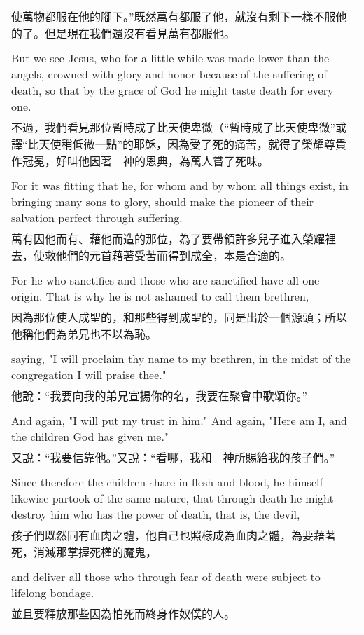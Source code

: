 \begin{tabularx}{\textwidth}{p{}}
使萬物都服在他的腳下。”既然萬有都服了他，就沒有剩下一樣不服他的了。但是現在我們還沒有看見萬有都服他。 \\ \\
But we see Jesus, who for a little while was made lower than the angels, crowned with glory and honor because of the suffering of death, so that by the grace of God he might taste death for every one. \\
不過，我們看見那位暫時成了比天使卑微（“暫時成了比天使卑微”或譯“比天使稍低微一點”的耶穌，因為受了死的痛苦，就得了榮耀尊貴作冠冕，好叫他因著　神的恩典，為萬人嘗了死味。 \\ \\
For it was fitting that he, for whom and by whom all things exist, in bringing many sons to glory, should make the pioneer of their salvation perfect through suffering. \\
萬有因他而有、藉他而造的那位，為了要帶領許多兒子進入榮耀裡去，使救他們的元首藉著受苦而得到成全，本是合適的。 \\ \\
For he who sanctifies and those who are sanctified have all one origin. That is why he is not ashamed to call them brethren, \\
因為那位使人成聖的，和那些得到成聖的，同是出於一個源頭；所以他稱他們為弟兄也不以為恥。 \\ \\
saying, "I will proclaim thy name to my brethren, in the midst of the congregation I will praise thee." \\
他說：“我要向我的弟兄宣揚你的名，我要在聚會中歌頌你。” \\ \\
And again, "I will put my trust in him." And again, "Here am I, and the children God has given me." \\
又說：“我要信靠他。”又說：“看哪，我和　神所賜給我的孩子們。” \\ \\
Since therefore the children share in flesh and blood, he himself likewise partook of the same nature, that through death he might destroy him who has the power of death, that is, the devil, \\
孩子們既然同有血肉之體，他自己也照樣成為血肉之體，為要藉著死，消滅那掌握死權的魔鬼， \\ \\
and deliver all those who through fear of death were subject to lifelong bondage. \\
並且要釋放那些因為怕死而終身作奴僕的人。 \\ \\

\end{tabularx}
